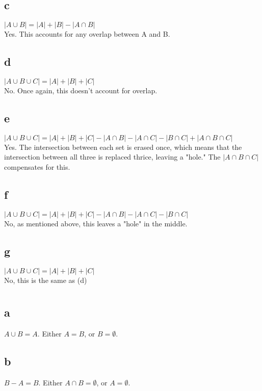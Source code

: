 \documentclass[12pt]{article}
\begin{document}
\subsection*{c}
\(|A \cup B| = |A| + |B| - |A \cap B|\)\\
Yes. This accounts for any overlap between A and B.\\
\subsection*{d}
\(|A \cup B \cup C| = |A| + |B| + |C|\)\\
No. Once again, this doesn't account for overlap.\\
\subsection*{e}
\(|A \cup B \cup C| = |A| + |B| + |C| - |A \cap B| - |A \cap C| - |B \cap C| + |A \cap B \cap C|\)\\
Yes. The intersection between each set is erased once, which means that the intersection between all three is replaced thrice, leaving a "hole." The \(|A \cap B \cap C|\) compensates for this.\\
\subsection*{f}
\(|A \cup B \cup C| = |A| + |B| + |C| - |A \cap B| - |A \cap C| - |B \cap C|\)\\
No, as mentioned above, this leaves a "hole" in the middle.\\
\subsection*{g}
\(|A \cup B \cup C| = |A| + |B| + |C|\)\\
No, this is the same as (d)

\section{}
\subsection*{a}
\(A \cup B = A\). Either \(A = B\), or \(B = \emptyset\).
\subsection*{b}
\(B - A = B\). Either \(A \cap B = \emptyset\), or \(A = \emptyset\).
\end{document}
